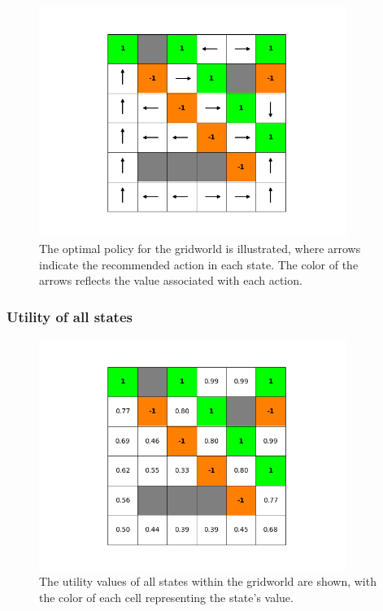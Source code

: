 \documentclass{article}
\begin{document}
\begin{figure}[H]
    \includegraphics[width=100mm]{../asset/policy_iteration_policy.png}
    \caption{The optimal policy for the gridworld is illustrated, where arrows indicate the recommended action in each state. The color of the arrows reflects the value associated with each action.}
    \label{fig:policy_iteration_policy}
\end{figure}

\subsubsection{Utility of all states}

\begin{figure}[H]
    \includegraphics[width=100mm]{../asset/policy_iteration_utility.png}
    \caption{The utility values of all states within the gridworld are shown, with the color of each cell representing the state's value.}
    \label{fig:policy_iteration_utility}
\end{figure}
\end{document}
